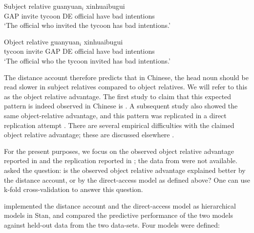 \documentclass{cambridge7A}\usepackage[]{graphicx}\usepackage[]{color}
\begin{document}
\begin{exe}
\ex  \label{ex:chineseRCs}
\begin{xlist}
\item
Subject relative
 guanyuan$_i$ xinhuaibugui \\
GAP invite tycoon DE official {have bad intentions}\\
\glt `The official who invited the tycoon has bad intentions.’
\item 
Object relative 
 guanyuan$_i$ xinhuaibugui \\
tycoon invite GAP DE official { have bad intentions}\\
\glt `The official who the tycoon invited has bad intentions.’
\end{xlist}
\end{exe}

The distance account therefore predicts that in Chinese, the head noun should be read slower in subject relatives compared to object relatives. We will refer to this as the object relative advantage. The first study to claim that this expected pattern is indeed observed in Chinese is \cite{HsiaoGibson2003}. A  subsequent study \citep{gibsonwu} also showed the same object-relative advantage, and this pattern was replicated in a  direct replication attempt \citep{VasishthChenLi2013}.  There are several empirical difficulties  with the claimed object relative advantage; these are discussed elsewhere \citep{VasishthChenLi2013,WuKaiserVasishth2017,JagerChenLi2015}. 

For the present purposes, we focus on the observed object relative advantage reported in \cite{gibsonwu} and the replication reported in \cite{VasishthChenLi2013}; the data from \cite{HsiaoGibson2003} were not available. \cite{VasishthChopinRyderNicenboimCogSci2017}  asked the question: is the observed  object relative advantage explained better by the distance account, or  by the direct-access model as defined above? One can use k-fold cross-validation  to answer this question.

\cite{VasishthChopinRyderNicenboimCogSci2017} implemented the distance account and the direct-access model as hierarchical models in  Stan, and compared the predictive performance of the two models against held-out data from the two data-sets. Four models were defined:
\end{document}
